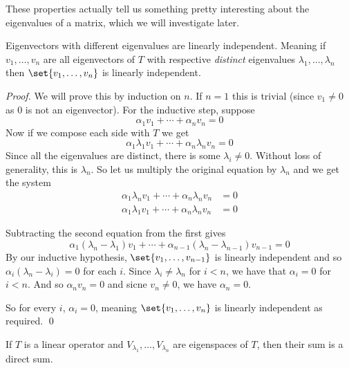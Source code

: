 These properties actually tell us something pretty interesting about the eigenvalues of a matrix, which we will investigate later.

\begin{prop*}

    Eigenvectors with different eigenvalues are linearly independent.
    Meaning if $v_1,\dots,v_n$ are all eigenvectors of $T$ with respective \emph{distinct} eigenvalues $\lambda_1,\dots,\lambda_n$ then $\set{v_1,\dots,v_n}$ is linearly independent.

\end{prop*}

\begin{proof}

    We will prove this by induction on $n$.
    If $n=1$ this is trivial (since $v_1\neq0$ as $0$ is not an eigenvector).
    For the inductive step, suppose
    \[ \alpha_1v_1 + \cdots + \alpha_nv_n = 0 \]
    Now if we compose each side with $T$ we get
    \[ \alpha_1\lambda_1v_1 + \cdots + \alpha_n\lambda_nv_n = 0 \]
    Since all the eigenvalues are distinct, there is some $\lambda_i\neq0$.
    Without loss of generality, this is $\lambda_n$.
    So let us multiply the original equation by $\lambda_n$ and we get the system
    \begin{align*}
        \alpha_1\lambda_nv_1 + \cdots + \alpha_n\lambda_nv_n &= 0 \\
        \alpha_1\lambda_1v_1 + \cdots + \alpha_n\lambda_nv_n &= 0
    \end{align*}

    Subtracting the second equation from the first gives
    \[ \alpha_1(\lambda_n-\lambda_1)v_1 + \cdots + \alpha_{n-1}(\lambda_n-\lambda_{n-1})v_{n-1} = 0 \]
    By our inductive hypothesis, $\set{v_1,\dots,v_{n-1}}$ is linearly independent and so $\alpha_i(\lambda_n-\lambda_i)=0$ for each $i$.
    Since $\lambda_i\neq\lambda_n$ for $i<n$, we have that $\alpha_i=0$ for $i<n$.
    And so $\alpha_nv_n=0$ and sicne $v_n\neq0$, we have $\alpha_n=0$.

    So for every $i$, $\alpha_i=0$, meaning $\set{v_1,\dots,v_n}$ is linearly independent as required.
    \qed

\end{proof}

\begin{prop*}

    If $T$ is a linear operator and $V_{\lambda_1},\dots,V_{\lambda_n}$ are eigenspaces of $T$, then their sum is a direct sum.

\end{prop*}

